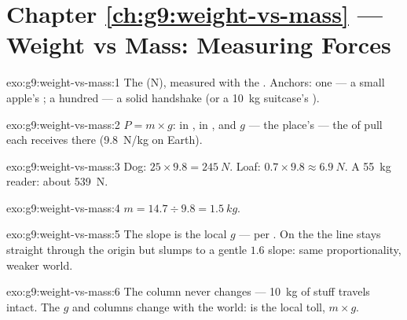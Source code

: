 \section*{Chapter \ref{ch:g9:weight-vs-mass} --- Weight vs Mass: Measuring Forces}

\begin{solution}{exo:g9:weight-vs-mass:1}
The  (\unit{N}), measured with the . Anchors:
one  --- a small apple's ; a hundred --- a solid
handshake (or a \qty{10}{kg} suitcase's ).
\end{solution}

\begin{solution}{exo:g9:weight-vs-mass:2}
$P = m \times g$:  in ,  in , and
$g$ --- the place's  --- the  of
pull each  receives there (\qty{9.8}{N/kg} on Earth).
\end{solution}

\begin{solution}{exo:g9:weight-vs-mass:3}
Dog: $25 \times 9.8 = \qty{245}{N}$. Loaf: $0.7 \times 9.8
\approx \qty{6.9}{N}$. A \qty{55}{kg} reader: about
\qty{539}{N}.
\end{solution}

\begin{solution}{exo:g9:weight-vs-mass:4}
$m = 14.7 \div 9.8 = \qty{1.5}{kg}$.
\end{solution}

\begin{solution}{exo:g9:weight-vs-mass:5}
The slope is the local $g$ ---  per . On the
 the line stays straight through the origin but slumps to
a gentle $1.6$ slope: same proportionality, weaker world.
\end{solution}

\begin{solution}{exo:g9:weight-vs-mass:6}
The  column never changes --- \qty{10}{kg} of stuff
travels intact. The $g$ and  columns change with the
world:  is the local toll, $m \times g$.
\end{solution}

